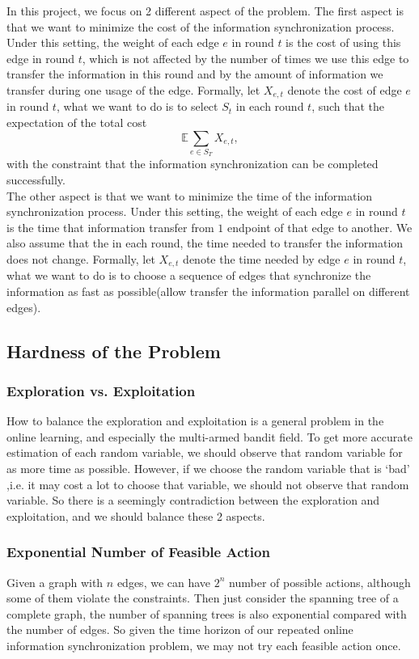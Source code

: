 \documentclass{article}
\theoremstyle{plain}
\theoremstyle{definition}
\theoremstyle{remark}
\begin{document}
    In this project, we focus on 2 different aspect of the problem. The first aspect is that we want to minimize the cost of the information synchronization process. Under this setting, the weight of each edge $e$ in round $t$ is the cost of using this edge in round $t$, which is not affected by the number of times we use this edge to transfer the information in this round and by the amount of information we transfer during one usage of the edge. Formally, let $X_{e,t}$ denote the cost of edge $e$ in round $t$, what we want to do is to select $S_t$ in each round $t$, such that the expectation of the total cost
    \[\mathbb E\sum_{e\in S_T}X_{e,t},\]
    with the constraint that the information synchronization can be completed successfully.\\

    The other aspect is that we want to minimize the time of the information synchronization process. Under this setting, the weight of each edge $e$ in round $t$ is the time that information transfer from $1$ endpoint of that edge to another. We also assume that the in each round, the time needed to transfer the information does not change. Formally, let $X_{e,t}$ denote the time needed by edge $e$ in round $t$, what we want to do is to choose a sequence of edges that synchronize the information as fast as possible(allow transfer the information parallel on different edges).

    \subsection{Hardness of the Problem}
    \subsubsection{Exploration vs. Exploitation}
    How to balance the exploration and exploitation is a general problem in the online learning, and especially the multi-armed bandit field. To get more accurate estimation of each random variable, we should observe that random variable for as more time as possible. However, if we choose the random variable that is `bad' ,i.e. it may cost a lot to choose that variable, we should not observe that random variable. So there is a seemingly contradiction between the exploration and exploitation, and we should balance these 2 aspects.

    \subsubsection{Exponential Number of Feasible Action}
    Given a graph with $n$ edges, we can have $2^n$ number of possible actions, although some of them violate the constraints. Then just consider the spanning tree of a complete graph, the number of spanning trees is also exponential compared with the number of edges. So given the time horizon of our repeated online information synchronization problem, we may not try each feasible action once.
\end{document}
